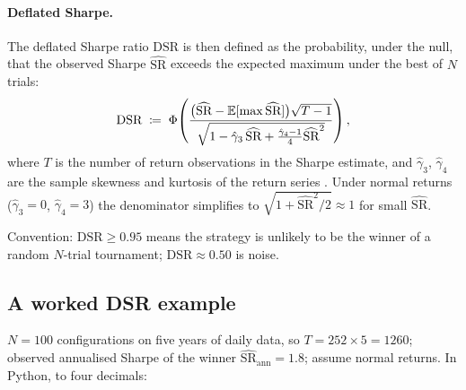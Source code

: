 \paragraph{Deflated Sharpe.} The deflated Sharpe ratio $\text{DSR}$
is then defined as the probability, under the null, that the
observed Sharpe $\widehat{\text{SR}}$ exceeds the expected maximum
under the best of $N$ trials:
\begin{equation}
\text{DSR}
  \;\coloneqq\;
  \Phi\!\left(
    \frac{\bigl(\widehat{\text{SR}} - \mathbb{E}[\max \widehat{\text{SR}}]\bigr)
          \sqrt{T - 1}}
         {\sqrt{1 - \hat\gamma_3\,\widehat{\text{SR}}
                + \tfrac{\hat\gamma_4 - 1}{4}\widehat{\text{SR}}^2}}
    \right),
  \label{eq:dsr_definition}
\end{equation}
where $T$ is the number of return observations in the Sharpe
estimate, and $\hat\gamma_3$, $\hat\gamma_4$ are the sample skewness
and kurtosis of the return series \citep{bailey2014deflated}. Under
normal returns ($\hat\gamma_3 = 0$, $\hat\gamma_4 = 3$) the
denominator simplifies to $\sqrt{1 + \widehat{\text{SR}}^2/2}
\approx 1$ for small $\widehat{\text{SR}}$.

Convention: $\text{DSR} \geq 0.95$ means the strategy is unlikely to
be the winner of a random $N$-trial tournament; $\text{DSR} \approx
0.50$ is noise.

\subsection{A worked DSR example}
\label{subsec:bt_dsr_worked}

$N = 100$ configurations on five years of daily data, so
$T = 252 \times 5 = 1260$; observed annualised Sharpe of the winner
$\widehat{\text{SR}}_{\text{ann}} = 1.8$; assume normal returns. In
Python, to four decimals:

